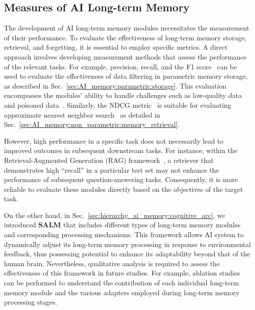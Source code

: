 \documentclass[journal,hideappendix]{vgtc}
\begin{document}
\subsection{Measures of AI Long-term Memory}
\label{sec:next_steps:measures}

The development of AI long-term memory modules necessitates the measurement of their performance. To evaluate the effectiveness of long-term memory storage, retrieval, and forgetting, it is essential to employ specific metrics. A direct approach involves developing measurement methods that assess the performance of the relevant tasks. 
For example, precision, recall, and the F1 score~\cite{yacouby2020probabilistic} can be used to evaluate the effectiveness of data filtering in parametric memory storage, as described in Sec.~\ref{sec:AI_memory:parametric:storage}. 
This evaluation encompasses the modules' ability to handle challenges such as low-quality data~\cite{gibney2024ai,shumailov2024ai} and poisoned data~\cite{steinhardt2017certified,cina2023wild}. 
Similarly, the NDCG metric~\cite{wang2013theoretical} is suitable for evaluating approximate nearest neighbor search~\cite{arya1993approximate,indyk1998approximate,malkov2018efficient,spann2021chen} as detailed in Sec.~\ref{sec:AI_memory:non_parametric:memory_retrieval}.

However, high performance in a specific task does not necessarily lead to improved outcomes in subsequent downstream tasks. For instance, within the Retrieval-Augmented Generation (RAG) framework~\cite{gao2023retrieval,zhao2024retrieval}, a retriever that demonstrates high ``recall'' in a particular test set may not enhance the performance of subsequent question-answering tasks. Consequently, it is more reliable to evaluate these modules directly based on the objectives of the target task.

On the other hand, in Sec.~\ref{sec:hierarchy_ai_memory:cognitive_arc}, we introduced \textbf{SALM} that includes different types of long-term memory modules and corresponding processing mechanisms.
This framework allows AI system to dynamically adjust its long-term memory processing in response to environmental feedback, thus possessing potential to enhance its adaptability beyond that of the human brain. Nevertheless, qualitative analysis is required to assess the effectiveness of this framework in future studies.
For example, ablation studies~\cite{sheikholeslami2019ablation} can be performed to understand the contribution of each individual long-term memory module and the various adapters employed during long-term memory processing stages.
\end{document}
